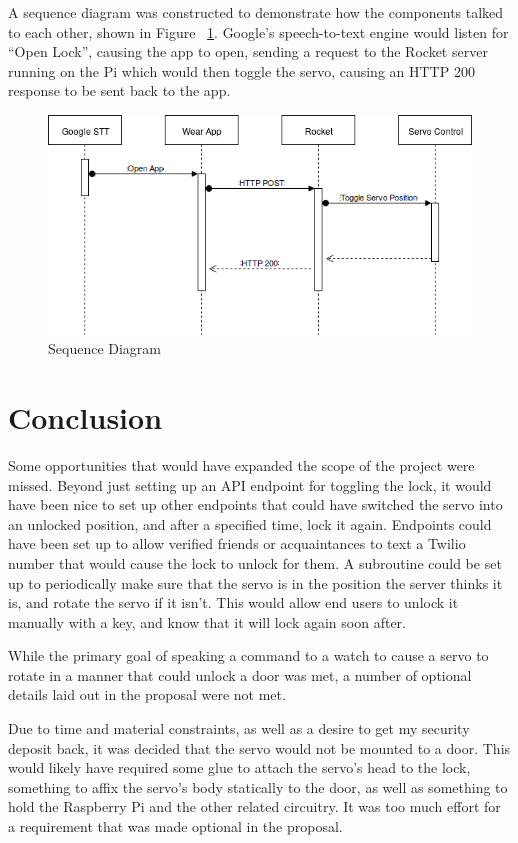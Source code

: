 \documentclass[a4paper]{article}
\begin{document}
A sequence diagram was constructed to demonstrate how the components talked to each other, shown in Figure ~\ref{fig:sequence}.
Google's speech-to-text engine would listen for ``Open Lock'', causing the app to open, sending a request to the Rocket server running on the Pi which would then toggle the servo, causing an HTTP 200 response to be sent back to the app.
\begin{figure}[H]
    \center
    \caption{Sequence Diagram}
    \label{fig:sequence}
    \includegraphics[width=14cm]{SesameSequenceDiagram.png}
\end{figure}



\section{Conclusion}\label{sec:conclusion}

Some opportunities that would have expanded the scope of the project were missed.
Beyond just setting up an API endpoint for toggling the lock, it would have been nice to set up other endpoints that could have switched the servo into an unlocked position, and after a specified time, lock it again.
Endpoints could have been set up to allow verified friends or acquaintances to text a Twilio number that would cause the lock to unlock for them.
A subroutine could be set up to periodically make sure that the servo is in the position the server thinks it is, and rotate the servo if it isn't.
This would allow end users to unlock it manually with a key, and know that it will lock again soon after.


While the primary goal of speaking a command to a watch to cause a servo to rotate in a manner that could unlock a door was met, a number of optional details laid out in the proposal were not met.

Due to time and material constraints, as well as a desire to get my security deposit back, it was decided that the servo would not be mounted to a door.
This would likely have required some glue to attach the servo's head to the lock, something to affix the servo's body statically to the door, as well as something to hold the Raspberry Pi and the other related circuitry.
It was too much effort for a requirement that was made optional in the proposal.
\end{document}
